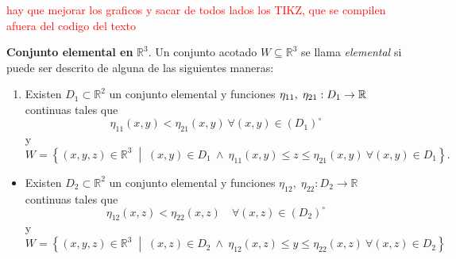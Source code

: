 
\textcolor{red}{hay que mejorar los graficos y sacar de todos lados los TIKZ, que se compilen afuera del codigo del texto}


\begin{definition}  
\textbf{Conjunto elemental en } $\mathbb{R}^3$.  Un conjunto acotado $W\subseteq\mathbb{R}^3$ se llama \emph{elemental} si puede ser descrito de alguna de las siguientes maneras:

\begin{enumerate}
    \item Existen $D_1 \subset  \mathbb{R}^2 $ un conjunto elemental y funciones  $\eta_{11},\; \eta_{21}: D_1\to\mathbb{R}$  continuas  tales que $$\eta_{11}(x, y) <  \eta_{21}(x, y)  \: \forall (x,y) \in  (D_1)^{\circ}$$ y \begin{equation}\label{def_conj_elem_R3_t1} W = \left\{ (x, y, z) \in \mathbb{R}^3 \;\middle|\;  (x,y) \in D_1 \: \land  \: \eta_{11}(x, y) \leq z \leq \eta_{21}(x, y)  \: \forall (x,y) \in D_1 \right\}.\end{equation}
\begin{figure}[htbp]
    \centering
     
    \label{fig:conjunto tipo 1}
\end{figure}
\end{enumerate}
\end{definition}


\begin{itemize}
    \item Existen $D_2 \subset \mathbb{R}^2$ un conjunto elemental y funciones $\eta_{12},\; \eta_{22}: D_2\to\mathbb{R}$ continuas tales que 
    \[
    \eta_{12}(x, z) < \eta_{22}(x, z) \quad \forall (x,z) \in (D_2)^{\circ}
    \]
    y 
    \begin{equation}
        \label{def_conj_elem_R3_t2} 
        W = \left\{ (x, y, z) \in \mathbb{R}^3 \;\middle|\; (x,z) \in D_2 \: \land \: \eta_{12}(x, z) \leq y \leq \eta_{22}(x, z) \: \forall (x,z) \in D_2 \right\}
    \end{equation}
\end{itemize}

\begin{figure}[htbp]
    \centering
     
    \label{fig:Conjunto tipo 2}
\end{figure}

